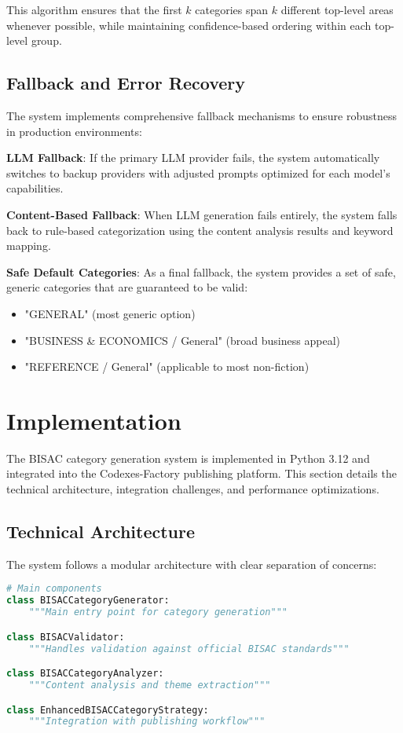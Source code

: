 \documentclass{article}
\begin{document}
This algorithm ensures that the first $k$ categories span $k$ different top-level areas whenever possible, while maintaining confidence-based ordering within each top-level group.

\subsection{Fallback and Error Recovery}

The system implements comprehensive fallback mechanisms to ensure robustness in production environments:

\textbf{LLM Fallback}: If the primary LLM provider fails, the system automatically switches to backup providers with adjusted prompts optimized for each model's capabilities.

\textbf{Content-Based Fallback}: When LLM generation fails entirely, the system falls back to rule-based categorization using the content analysis results and keyword mapping.

\textbf{Safe Default Categories}: As a final fallback, the system provides a set of safe, generic categories that are guaranteed to be valid:
\begin{itemize}
\item "GENERAL" (most generic option)
\item "BUSINESS \& ECONOMICS / General" (broad business appeal)
\item "REFERENCE / General" (applicable to most non-fiction)
\end{itemize}

\section{Implementation}
\label{sec:implementation}

The BISAC category generation system is implemented in Python 3.12 and integrated into the Codexes-Factory publishing platform. This section details the technical architecture, integration challenges, and performance optimizations.

\subsection{Technical Architecture}

The system follows a modular architecture with clear separation of concerns:

\begin{lstlisting}[language=python, caption=Core System Components]
# Main components
class BISACCategoryGenerator:
    """Main entry point for category generation"""

class BISACValidator:
    """Handles validation against official BISAC standards"""

class BISACCategoryAnalyzer:
    """Content analysis and theme extraction"""

class EnhancedBISACCategoryStrategy:
    """Integration with publishing workflow"""
\end{lstlisting}
\end{document}
